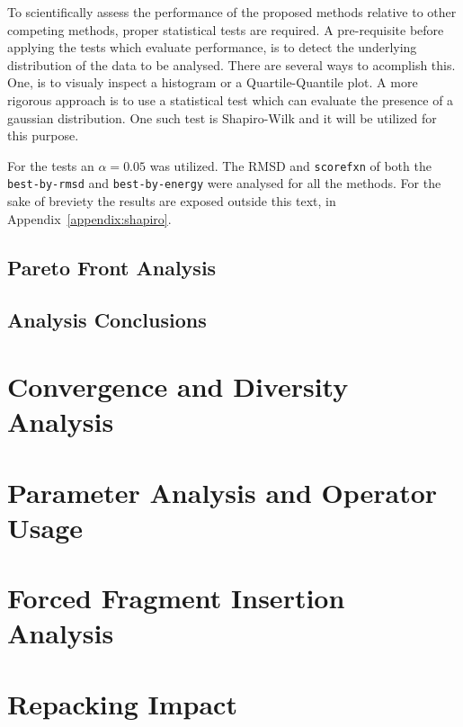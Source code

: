 To scientifically assess the performance of the proposed methods relative to
other competing methods, proper statistical tests are required. A pre-requisite
before applying the tests which evaluate performance, is to detect the
underlying distribution of the data to be analysed. There are several ways to
acomplish this. One, is to visualy inspect a histogram or a Quartile-Quantile
plot. A more rigorous approach is to use a statistical test which can evaluate
the presence of a gaussian distribution. One such test is Shapiro-Wilk and it
will be utilized for this purpose.

For the tests an $\alpha = 0.05$ was utilized. The RMSD and \texttt{scorefxn}
of both the \texttt{best-by-rmsd} and \texttt{best-by-energy} were analysed for
all the methods. For the sake of breviety the results are exposed outside this
text, in Appendix~\ref{appendix:shapiro}.



\subsection{Pareto Front Analysis}\label{sec:pareto-front-analysis}

\subsection{Analysis Conclusions}\label{sec:analysis-conclusions}


\section{Convergence and Diversity Analysis}

\section{Parameter Analysis and Operator Usage}

\section{Forced Fragment Insertion Analysis}

\section{Repacking Impact}

